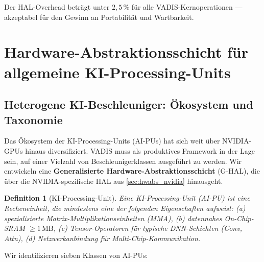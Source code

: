 ﻿\documentclass[12pt,a4paper]{article}
\newtheorem{definition}[theorem]{Definition}
\begin{document}
\noindent Der HAL-Overhead beträgt unter $2{,}5\,\%$ für alle
VADIS-Kernoperationen --- akzeptabel für den Gewinn an
Portabilität und Wartbarkeit.

\section{Hardware-Abstraktionsschicht für allgemeine KI-Processing-Units}
\label{sec:hwabs_general}

\subsection{Heterogene KI-Beschleuniger: Ökosystem und Taxonomie}
\label{sub:aipu_taxonomy}

Das Ökosystem der KI-Processing-Units (AI-PUs) hat sich weit
über NVIDIA-GPUs hinaus diversifiziert. VADIS muss als
produktives Framework in der Lage sein, auf einer Vielzahl
von Beschleunigerklassen ausgeführt zu werden. Wir entwickeln
eine \textbf{Generalisierte Hardware-Abstraktionsschicht}
(G-HAL), die über die NVIDIA-spezifische HAL aus
\cref{sec:hwabs_nvidia} hinausgeht.

\begin{definition}[KI-Processing-Unit]
\label{def:aipu}
Eine \emph{KI-Processing-Unit} (AI-PU) ist eine Recheneinheit,
die mindestens eine der folgenden Eigenschaften aufweist:
(a) spezialisierte Matrix-Multiplikationseinheiten (MMA),
(b) datennahes On-Chip-SRAM $\geq 1\,\text{MB}$,
(c) Tensor-Operatoren für typische DNN-Schichten (Conv, Attn),
(d) Netzwerkanbindung für Multi-Chip-Kommunikation.
\end{definition}

Wir identifizieren sieben Klassen von AI-PUs:
\end{document}
